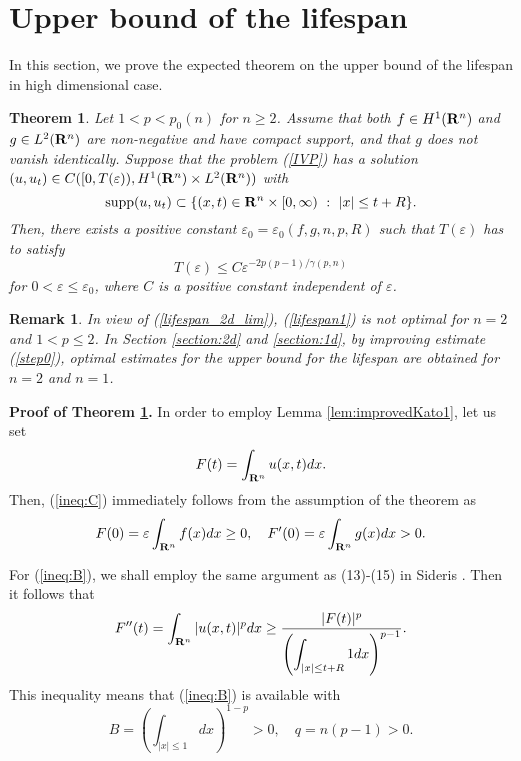 \documentclass[a4paper,12pt]{article}
\numberwithin{equation}{section}
\def\R{{\bf R}}
\def\d{\displaystyle}
\def\e{{\varepsilon}}
\newtheorem{thm}{Theorem}[section]
\newtheorem{rem}{Remark}[section]
\begin{document}
\section{Upper bound of the lifespan}
\label{section:lifespan}
In this section, we prove the expected theorem on the upper bound of the lifespan
in high dimensional case.
\begin{thm}
\label{thm:main1}
Let $1<p<p_0(n)$ for $n\ge2$.
Assume that both $f\in H^1(\R^n)$ and $g\in L^2(\R^n)$
are non-negative and have compact support,
and that $g$ does not vanish identically.
Suppose that the problem {\rm(\ref{IVP})} has a solution
$(u,u_t)\in C([0,T(\e)),H^1(\R^n)\times L^2(\R^n))$ with
\begin{equation}
\label{support}
\mbox{\rm supp}(u,u_t)\subset\{(x,t)\in\R^n\times[0,\infty)\ :\ |x|\le t+R\}.
\end{equation}
Then, there exists a positive constant $\e_0
=\e_0(f,g,n,p,R)$ such that $T(\e)$ has to satisfy
\begin{equation}
\label{lifespan1}
T(\e)\le C\e^{-2p(p-1)/\gamma(p,n)}
\end{equation}
for $0<\e\le\e_0$, where $C$ is a positive constant independent of $\e$.
\end{thm}
\begin{rem}
\label{rem:thm1}
In view of (\ref{lifespan_2d_lim}), (\ref{lifespan1}) is not optimal for $n=2$ and $1<p\le2$.
In Section \ref{section:2d} and \ref{section:1d}, by improving estimate  (\ref{step0}),
optimal estimates for the upper bound for the lifespan are obtained for $n=2$ and $n=1$.
\end{rem}
\par\noindent
{\bf Proof of Theorem \ref{thm:main1}.}
In order to employ Lemma \ref{lem:improvedKato1}, let us set
\[
F(t)=\int_{\R^n}u(x,t)dx.
\]
Then, (\ref{ineq:C}) immediately follows from the assumption of the theorem as
\begin{equation}
\label{initial}
F(0)=\e\int_{\R^n}f(x)dx\ge0,\quad F'(0)=\e\int_{\R^n}g(x)dx>0.
\end{equation}
\par
For (\ref{ineq:B}), we shall employ the same argument as (13)-(15) in Sideris \cite{Si84}.
Then it follows that
\[
F''(t)=\int_{\R^n}|u(x,t)|^pdx
\ge\frac{|F(t)|^p}{\d\left(\int_{|x|\le t+R}1dx\right)^{p-1}}.
\]
This inequality means that (\ref{ineq:B}) is available with
\begin{equation}
\label{Bq}
B=\left(\int_{|x|\le1}dx\right)^{1-p}>0,\quad q=n(p-1)>0.
\end{equation}
\end{document}
